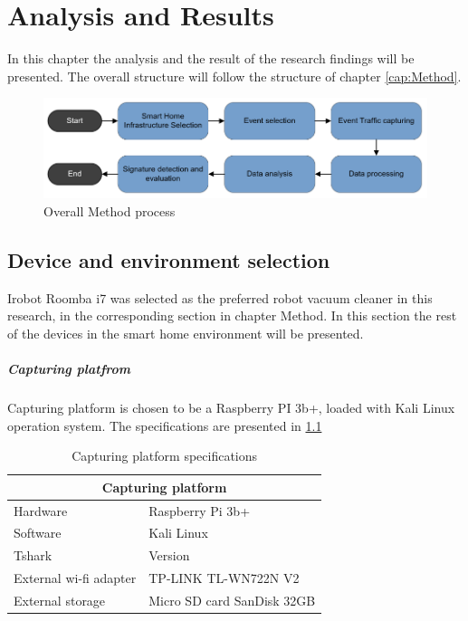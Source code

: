 \chapter{Analysis and Results}
In this chapter the analysis and the result of the research findings will be presented. The overall structure will follow the structure of chapter \ref{cap:Method}.

\begin{figure}[H]
    \centering
    \includegraphics[width=\textwidth]{figures/Method_process.png}
    \caption{Overall Method process}
    \label{fig:Analysis_process}
\end{figure}



\section{Device and environment selection}
Irobot Roomba i7 was selected as the preferred robot vacuum cleaner in this research, in the corresponding section in chapter Method. In this section the rest of the devices in the smart home environment will be presented. 

\paragraph{Capturing platfrom}
Capturing platform is chosen to be a Raspberry PI 3b+, loaded with Kali Linux operation system. The specifications are presented in \ref{tab:CapturingPlatfromSpec}

\begin{table}[H]
\centering
\caption{Capturing platform specifications}
\label{tab:CapturingPlatfromSpec}
\begin{tabular}{|ll|}
\hline
\multicolumn{2}{|c|}{\textbf{Capturing platform}}                         \\ \hline
\multicolumn{1}{|l|}{Hardware}               & Raspberry Pi 3b+           \\ \hline
\multicolumn{1}{|l|}{Software}               & Kali Linux                 \\ \hline
\multicolumn{1}{|l|}{Tshark}                 & Version                    \\ \hline
\multicolumn{1}{|l|}{External wi-fi adapter} & TP-LINK TL-WN722N V2       \\ \hline
\multicolumn{1}{|l|}{External storage}       & Micro SD card SanDisk 32GB \\ \hline
\end{tabular}
\end{table}

